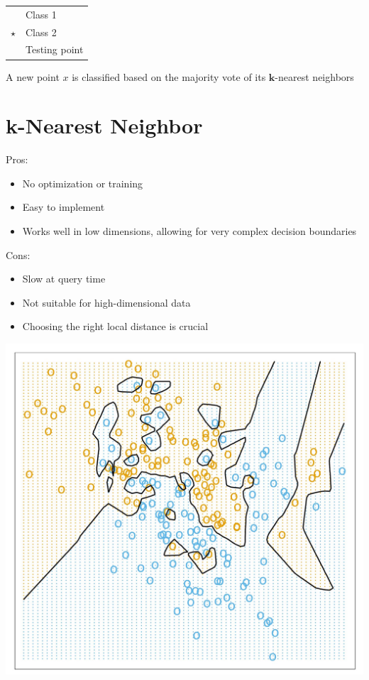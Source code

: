 \documentclass[10pt]{article}
\begin{document}
\begin{center}
\begin{tabular}{|ll|}
\hline
 & Class 1 \\
$\star$ & Class 2 \\
 & Testing point \\
\hline
\end{tabular}
\end{center}

A new point $x$ is classified based on the majority vote of its $\mathbf{k}$-nearest neighbors

\section*{k-Nearest Neighbor}
Pros:

\begin{itemize}
  \item No optimization or training
  \item Easy to implement
  \item Works well in low dimensions, allowing for very complex decision boundaries
\end{itemize}

Cons:

\begin{itemize}
  \item Slow at query time
  \item Not suitable for high-dimensional data
  \item Choosing the right local distance is crucial
\end{itemize}

\begin{center}
\includegraphics[max width=\textwidth]{2023_12_30_cf784c471dfd1dd5afbag-19}
\end{center}
\end{document}
